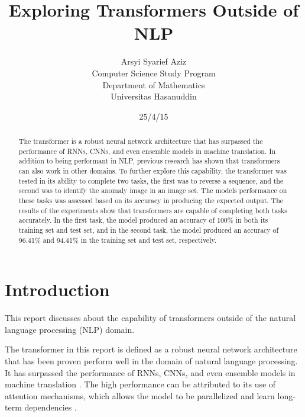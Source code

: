 \documentclass[peerreview]{IEEEtran}
\begin{document}
\title{Exploring Transformers Outside of NLP}



\author{Arsyi Syarief Aziz \\
Computer Science Study Program\\
Department of Mathematics\\
Universitas Hasanuddin\\
}
\date{25/4/15}

\maketitle
\tableofcontents
\listoffigures
\listoftables

\IEEEpeerreviewmaketitle
\begin{abstract}
The transformer is a robust neural network architecture that has surpassed the performance of RNNs, CNNs, and even ensemble models in machine translation. In addition to being performant in NLP, previous research has shown that transformers can also work in other domains. To further explore this capability, the transformer was tested in its ability to complete two tasks, the first was to reverse a sequence, and the second was to identify the anomaly image in an image set. The models performance on these tasks was assessed based on its accuracy in producing the expected output. The results of the experiments show that transformers are capable of completing both tasks accurately. In the first task, the model produced an accuracy of 100\% in both its training set and test set, and in the second task, the model produced an accuracy of 96.41\% and 94.41\% in the training set and test set, respectively.

\end{abstract}

\section{Introduction}

This report discusses about the capability of transformers outside of the natural language processing (NLP) domain.

The transformer in this report is defined as a robust neural network architecture that has been proven perform well in the domain of natural language processing. It has surpassed the performance of RNNs, CNNs, and even ensemble models in machine translation 
\cite{vaswani_2017}. The high performance can be attributed to its use of attention mechanisms, which allows the model to be parallelized and learn long-term dependencies \cite{vaswani_2017}.
\end{document}
